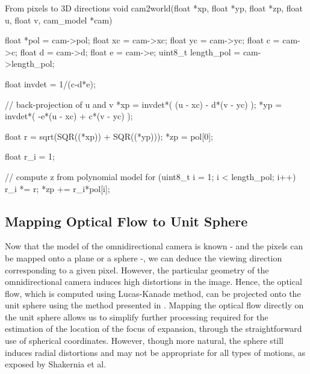 \newpage

\begin{center}
\begin{code}[colback=white, label=code:cameraModel]{From pixels to 3D directions}
void cam2world(float *xp, float *yp, float *zp, float u, 
		float v, cam_model *cam)
{
	 float *pol    = cam->pol;
	 float xc      = cam->xc;
	 float yc      = cam->yc; 
	 float c       = cam->c;
	 float d       = cam->d;
	 float e       = cam->e;
	 uint8_t length_pol = cam->length_pol;

	 float invdet  = 1/(c-d*e);

	 // back-projection of u and v
	 *xp = invdet*(    (u - xc) - d*(v - yc) );
	 *yp = invdet*( -e*(u - xc) + c*(v - yc) );
	  
	 float r = sqrt(SQR((*xp)) + SQR((*yp)));
	 *zp  	 = pol[0];
	 
	 float r_i = 1;
	 
	 // compute z from polynomial model
	 for (uint8_t i = 1; i < length_pol; i++)
	 {
	   r_i *= r;
	   *zp += r_i*pol[i];
	 }
}
\end{code}
\end{center}

\subsection{Mapping Optical Flow to Unit Sphere}
Now that the model of the omnidirectional camera is known - and the pixels can be mapped onto a plane or a sphere -, we can deduce the viewing direction corresponding to a given pixel. However, the particular geometry of the omnidirectional camera induces high distortions in the image. Hence, the optical flow, which is computed using Lucas-Kanade method, can be projected onto the unit sphere using the method presented in \cite{backproj}. Mapping the optical flow directly on the unit sphere allows us to simplify further processing required for the estimation of the location of the focus of expansion, through the straightforward use of spherical coordinates. However, though more natural, the sphere still induces radial distortions and may not be appropriate for all types of motions, as exposed by Shakernia et al.

